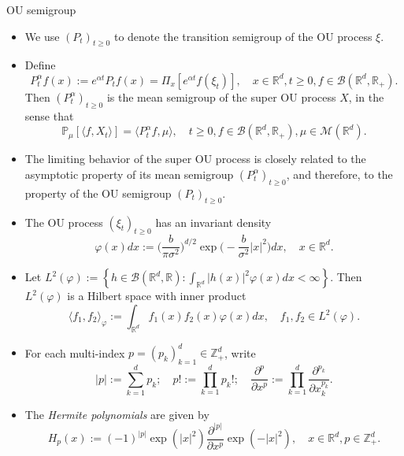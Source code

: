 \documentclass[9pt]{beamer}
\begin{document}
\begin{frame}[allowframebreaks]{OU semigroup}
\begin{itemize}
\item
	We use $(P_t)_{t\geq 0}$ to denote the transition semigroup of the OU process $\xi$.
\item
	Define
\[
    P^{\alpha}_t f(x)
    :=
    e^{\alpha t} P_t f(x) =
    \Pi_x [e^{\alpha t}f(\xi_t)],
    \quad x\in \mathbb R^d,t\geq 0, f\in \mathcal B(\mathbb R^d, \mathbb R_+).
\]
	Then $(P^\alpha_t)_{t\geq 0}$ is the mean semigroup of the super OU process $X$, in the sense that
\[
    \mathbb{P}_{\mu}[\langle f, X_t \rangle]
    = \langle P^\alpha_t f, \mu \rangle,
    \quad t\geq 0, f\in \mathcal B(\mathbb R^d, \mathbb R_+), \mu \in \mathcal M(\mathbb R^d).
\]
\item
	The limiting behavior of the super OU process is closely related to the asymptotic property of its mean semigroup $(P^\alpha_t)_{t\geq 0}$, and therefore, to the property of the OU semigroup $(P_t)_{t\geq 0}$.
\item
    The OU process $(\xi_t)_{t\geq 0}$ has an invariant density
\begin{equation}
    \varphi(x)dx
    :=\Big (\frac{b}{\pi \sigma^2}\Big )^{d/2}\exp \Big(-\frac{b}{\sigma^2}|x|^2 \Big)dx,
    \quad x\in \mathbb R^d.
\end{equation}
\item
    Let $L^2(\varphi):= \left\{ h  \in \mathcal B(\mathbb R^d, \mathbb R): \int_{\mathbb R^d} |h(x)|^2 \varphi(x) dx < \infty \right\}$.
    Then $L^2(\varphi)$ is a Hilbert space with inner product
\begin{equation}
    \langle f_1, f_2 \rangle_{\varphi}
    := \int_{\mathbb R^d}f_1(x)f_2(x)\varphi(x) dx, \quad f_1,f_2 \in L^2(\varphi).
\end{equation}
\item
    For each multi-index $p = (p_k)_{k = 1}^d \in \mathbb{Z}_+^{d}$, write 
\begin{equation}
	|p|:=\sum_{k=1}^d p_k;
	\quad p!:= \prod_{k= 1}^d p_k!;
	\quad \frac{\partial^p} {\partial x^p}:= \prod_{k = 1}^d\frac{\partial^{p_k}}{\partial x_k^{p_k}}.
\end{equation}
\item
    The \emph{Hermite polynomials} are given by
\begin{equation}
    H_p(x)
    :=(-1)^{|p|}\exp(|x|^2) \frac{\partial ^{|p|}}{\partial x^p} \exp(-|x|^2) ,
    \quad x\in \mathbb R^d,
    p \in \mathbb{Z}_+^{d}.
\end{equation}

\end{itemize}
\end{frame}
\end{document}
